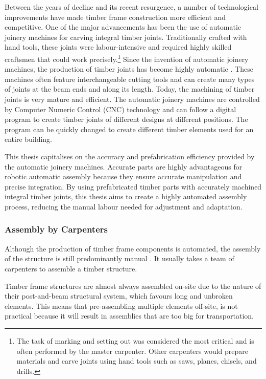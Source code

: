 Between the years of decline and its recent resurgence, a number of technological improvements have made timber frame construction more efficient and competitive. One of the major advancements has been the use of automatic joinery machines for carving integral timber joints. Traditionally crafted with hand tools, these joints were labour-intensive and required highly skilled craftsmen that could work precisely.\footnote{The task of marking and setting out was considered the most critical and is often performed by the master carpenter. Other carpenters would prepare materials and carve joints using hand tools such as saws, planes, chisels, and drills.}
Since the invention of automatic joinery machines, the production of timber joints has become highly automatic \parencite{hanshundeggeragCorporateDevelopment2023}. These machines often feature interchangeable cutting tools and can create many types of joints at the beam ends and along its length. Today, the machining of timber joints is very mature and efficient. The automatic joinery machines are controlled by Computer Numeric Control (CNC) technology and can follow a digital program to create timber joints of different designs at different positions. The program can be quickly changed to create different timber elements used for an entire building. 

This thesis capitalises on the accuracy and prefabrication efficiency provided by the automatic joinery machines. Accurate parts are highly advantageous for robotic automatic assembly because they ensure accurate manipulation and precise integration. By using prefabricated timber parts with accurately machined integral timber joints, this thesis aims to create a highly automated assembly process, reducing the manual labour needed for adjustment and adaptation. 

\subsubsection{Assembly by Carpenters}
\label{subsubsection:introduction-assembly-by-carpenters}

Although the production of timber frame components is automated, the assembly of the structure is still predominantly manual \parencite{willmannNewParadigmsAutomatic2016}. It usually takes a team of carpenters to assemble a timber structure.

Timber frame structures are almost always assembled on-site due to the nature of their post-and-beam structural system, which favours long and unbroken elements. This means that pre-assembling multiple elements off-site, is not practical because it will result in assemblies that are too big for transportation. 

